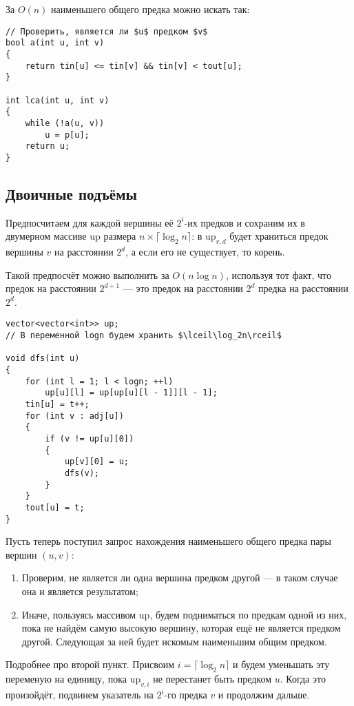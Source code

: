 За $O(n)$ наименьшего общего предка можно искать так:

\begin{verbatim}
// Проверить, является ли $u$ предком $v$
bool a(int u, int v)
{
    return tin[u] <= tin[v] && tin[v] < tout[u];
}

int lca(int u, int v)
{
    while (!a(u, v))
        u = p[u];
    return u;
}
\end{verbatim}

\subsection{Двоичные подъёмы}

Предпосчитаем для каждой вершины её $2^i$-их предков и сохраним их в двумерном массиве $\mathrm{up}$ размера $n \times \lceil\log_2 n\rceil$: в $\mathrm{up}_{v, d}$ будет храниться предок вершины $v$ на расстоянии $2^d$, а если его не существует, то корень.

Такой предпосчёт можно выполнить за $O(n\log n)$, используя тот факт, что предок на расстоянии $2^{d + 1}$ --- это предок на расстоянии $2^d$ предка на расстоянии $2^d$.

\begin{verbatim}
vector<vector<int>> up;
// В переменной logn будем хранить $\lceil\log_2n\rceil$

void dfs(int u)
{
    for (int l = 1; l < logn; ++l)
        up[u][l] = up[up[u][l - 1]][l - 1];
    tin[u] = t++;
    for (int v : adj[u])
    {
        if (v != up[u][0])
        {
            up[v][0] = u;
            dfs(v);
        }
    }
    tout[u] = t;
}
\end{verbatim}

Пусть теперь поступил запрос нахождения наименьшего общего предка пары вершин $(u, v)$:

\begin{enumerate}[nolistsep]
    \item Проверим, не является ли одна вершина предком другой --- в таком случае она и является результатом;
    \item Иначе, пользуясь массивом $\mathrm{up}$, будем подниматься по предкам одной из них, пока не найдём самую высокую вершину, которая ещё не является предком другой. Следующая за ней будет искомым наименьшим общим предком.
\end{enumerate}

Подробнее про второй пункт. Присвоим $i = \lceil\log_2n\rceil$ и будем уменьшать эту переменую на единицу, пока $\mathrm{up}_{v, i}$ не перестанет быть предком $u$. Когда это произойдёт, подвинем указатель на $2^i$-го предка $v$ и продолжим дальше.

